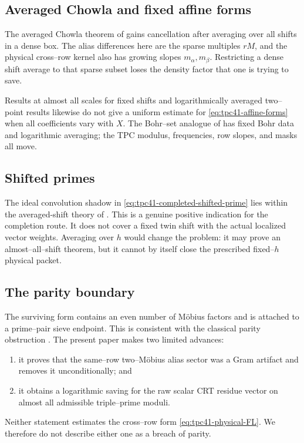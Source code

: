 \subsection{Averaged Chowla and fixed affine forms}

The averaged Chowla theorem of
\citet{MatomakiRadziwillTao2015} gains cancellation after averaging over
all shifts in a dense box.  The alias differences here are the sparse
multiples \(rM\), and the physical cross--row kernel also has growing
slopes \(m_\alpha,m_\beta\).  Restricting a dense shift average to that
sparse subset loses the density factor that one is trying to save.

Results at almost all scales for fixed shifts
\citep{TaoTeravainen2019} and logarithmically averaged two--point results
\citep{Tao2016} likewise do not give a uniform estimate for
\eqref{eq:tpc41-affine-forms} when all coefficients vary with \(X\).
The Bohr--set analogue of \citet{TeravainenWalker2025} has fixed Bohr
data and logarithmic averaging; the TPC modulus, frequencies, row slopes,
and masks all move.

\subsection{Shifted primes}

The ideal convolution shadow in
\eqref{eq:tpc41-completed-shifted-prime} lies within the averaged-shift
theory of \citet{Lichtman2022,LichtmanTeravainen2022}.  This is a genuine
positive indication for the completion route.  It does not cover a fixed
twin shift with the actual localized vector weights.  Averaging over
\(h\) would change the problem: it may prove an almost--all--shift theorem,
but it cannot by itself close the prescribed fixed--\(h\) physical packet.

\subsection{The parity boundary}

The surviving form contains an even number of M\"obius factors and is
attached to a prime--pair sieve endpoint.  This is consistent with the
classical parity obstruction \citep{HeathBrown1982Parity}.  The present
paper makes two limited advances:
\begin{enumerate}[label=(\roman*)]
 \item it proves that the same--row two--M\"obius alias sector was a Gram
 artifact and removes it unconditionally; and
 \item it obtains a logarithmic saving for the raw scalar CRT residue
 vector on almost all admissible triple--prime moduli.
\end{enumerate}
Neither statement estimates the cross--row form
\eqref{eq:tpc41-physical-FL}.  We therefore do not describe either one as
a breach of parity.
